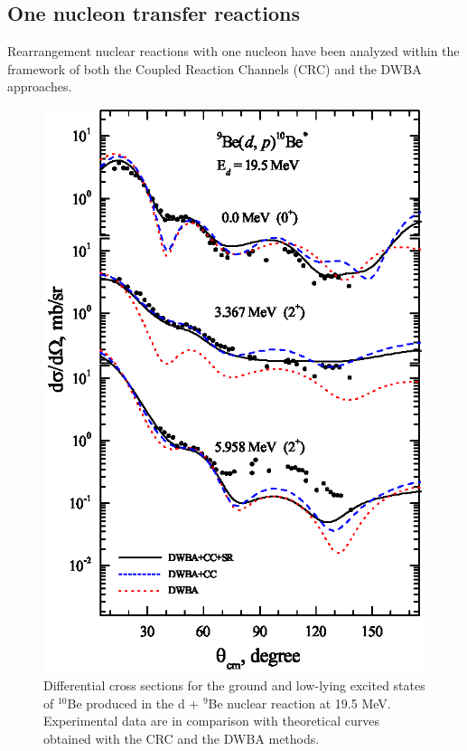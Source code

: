 \documentclass[10pt]{iopart}
\begin{document}
 




\subsection{One nucleon transfer reactions } 
Rearrangement nuclear reactions with one nucleon have been analyzed within the framework of both the Coupled Reaction Channels (CRC) and the DWBA approaches. 
 
\begin{figure}[tp]
\includegraphics[scale=0.8]{1H10BE.eps}
\caption{\label{1H10BE} Differential cross sections for the ground and low-lying excited states of $^{10}$Be  produced in the d + $^9$Be nuclear reaction at 19.5 MeV. Experimental data are in comparison with  theoretical curves obtained with the CRC and the DWBA methods.  }
\end{figure}
\end{document}
